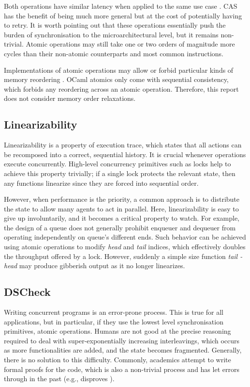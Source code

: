 \documentclass[12pt,a4paper,twoside]{report}
\begin{document}
Both operations have similar latency when applied to the same use case \cite{fad-cas-speed}. CAS has the benefit of being much more general but at the cost of potentially having to retry. It is worth pointing out that these operations essentially push the burden of synchronisation to the microarchitectural level, but it remains non-trivial. Atomic operations may still take one or two orders of magnitude more cycles than their non-atomic counterparts and most common instructions. 

Implementations of atomic operations may allow or forbid particular kinds of memory reordering \cite{memoryor11:online}. OCaml atomics only come with sequential consistency, which forbids any reordering across an atomic operation. Therefore, this report does not consider memory order relaxations.

\subsection{Linearizability}
\label{section:linearizability}
Linearizability is a property of execution trace, which states that all actions can be recomposed into a correct, sequential history. It is crucial whenever operations execute concurrently. High-level concurrency primitives such as locks help to achieve this property trivially; if a single lock protects the relevant state, then any functions linearize since they are forced into sequential order. 

However, when performance is the priority, a common approach is to distribute the state to allow many agents to act in parallel. Here, linearizability is easy to give up involuntarily, and it becomes a critical property to watch. For example, the design of a queue does not generally prohibit enqueuer and dequeuer from operating independently on queue's different ends. Such behavior can be achieved using atomic operations to modify \textit{head} and \textit{tail} indices, which effectively doubles the throughput offered by a lock. However, suddenly a simple size function \textit{tail - head} may produce gibberish output as it no longer linearizes. 

\subsection{DSCheck}
\label{section:background_dscheck}
Writing concurrent programs is an error-prone process. This is true for all applications, but in particular, if they use the lowest level synchronisation primitives, atomic operations. Humans are not good at the precise reasoning required to deal with super-exponentially increasing interleavings, which occurs as more functionalities are added, and the state becomes fragmented. Generally, there is no solution to this difficulty. Commonly, academics attempt to write formal proofs for the code, which is also a non-trivial process and has let errors through in the past (e.g., \cite{Norris2013} disproves \cite{correct_and_efficiect_deque}). 
\end{document}
